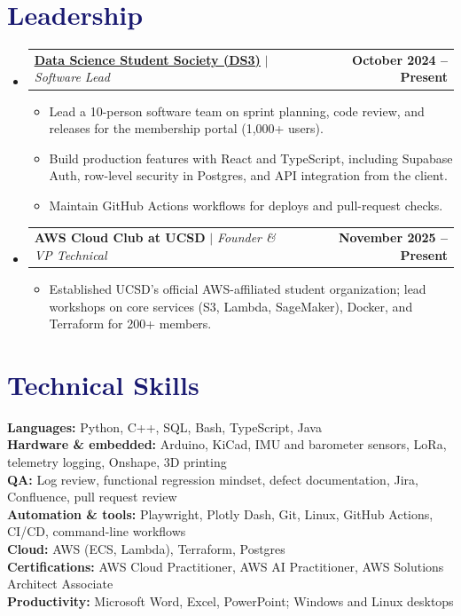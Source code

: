 \documentclass[letterpaper,11pt]{article}
\makeatletter
\newcommand{\resumeItem}[1]{
  \item\small{
    {#1 \vspace{-2pt}}
  }
}
\newcommand{\resumeProjectHeading}[2]{
    \item
    \begin{tabular*}{1.001\textwidth}{l@{\extracolsep{\fill}}r}
      \small#1 & \textbf{\small #2}\\
    \end{tabular*}\vspace{-7pt}
}
\newcommand{\resumeSubHeadingListStart}{\begin{itemize}[leftmargin=0.0in, label={}]}
\newcommand{\resumeSubHeadingListEnd}{\end{itemize}}
\newcommand{\resumeItemListStart}{\begin{itemize}}
\newcommand{\resumeItemListEnd}{\end{itemize}\vspace{-5pt}}
\newcommand\accentColor{MidnightBlue}
\makeatother
\begin{document}
\section{\textcolor{\accentColor}{Leadership}}
\vspace{-7pt}
\resumeSubHeadingListStart
\resumeProjectHeading{\textbf{\href{https://www.ds3atucsd.com/}{\underline{Data Science Student Society (DS3)}}} $|$ \emph{Software Lead}}{October 2024 -- Present}
\resumeItemListStart
\resumeItem{Lead a 10-person software team on sprint planning, code review, and releases for the membership portal (1,000+ users).}
\resumeItem{Build production features with React and TypeScript, including Supabase Auth, row-level security in Postgres, and API integration from the client.}
\resumeItem{Maintain GitHub Actions workflows for deploys and pull-request checks.}
\resumeItemListEnd
\vspace{-15pt}
\resumeProjectHeading{\textbf{AWS Cloud Club at UCSD} $|$ \emph{Founder \& VP Technical}}{November 2025 -- Present}
\resumeItemListStart
\resumeItem{Established UCSD's official AWS-affiliated student organization; lead workshops on core services (S3, Lambda, SageMaker), Docker, and Terraform for 200+ members.}
\resumeItemListEnd
\resumeSubHeadingListEnd
\vspace{-15pt}

\section{\textcolor{\accentColor}{Technical Skills}}
\begin{itemize}[leftmargin=0.15in, label={}]
  \small{\item{
        \textbf{Languages: }{Python, C++, SQL, Bash, TypeScript, Java} \\
        \textbf{Hardware \& embedded: }{Arduino, KiCad, IMU and barometer sensors, LoRa, telemetry logging, Onshape, 3D printing} \\
        \textbf{QA: }{Log review, functional regression mindset, defect documentation, Jira, Confluence, pull request review} \\
        \textbf{Automation \& tools: }{Playwright, Plotly Dash, Git, Linux, GitHub Actions, CI/CD, command-line workflows} \\
        \textbf{Cloud: }{AWS (ECS, Lambda), Terraform, Postgres} \\
        \textbf{Certifications: }{AWS Cloud Practitioner, AWS AI Practitioner, AWS Solutions Architect Associate} \\
        \textbf{Productivity: }{Microsoft Word, Excel, PowerPoint; Windows and Linux desktops}
        }}
\end{itemize}
\vspace{-10pt}
\end{document}
